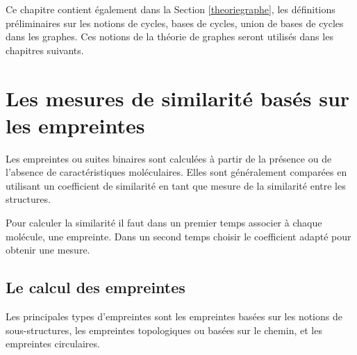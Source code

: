 
Ce chapitre contient également dans la Section \ref{theoriegraphe}, les définitions préliminaires sur les notions de cycles, bases de cycles, union de bases de cycles dans les graphes. Ces notions de la théorie de graphes seront utilisés dans les chapitres suivants. 


\section{Les mesures de similarité basés sur les empreintes}
\label{tanimoto}

Les empreintes ou suites binaires sont calculées à partir de la présence ou de l'absence de caractéristiques moléculaires. Elles sont généralement comparées en utilisant un coefficient de similarité en tant que mesure de la similarité entre les structures. %

Pour calculer la similarité il faut dans un premier temps associer à chaque molécule, une empreinte. Dans un second temps choisir le coefficient adapté pour obtenir une mesure. 

\subsection{Le calcul des empreintes}

Les principales types d'empreintes sont les empreintes basées sur les notions de sous-structures, les empreintes topologiques ou basées sur le chemin, et les empreintes circulaires.


